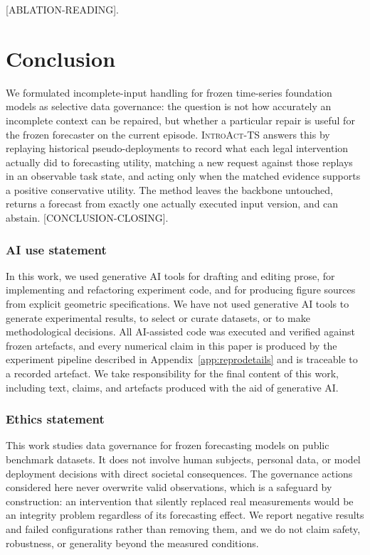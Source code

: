 \documentclass{article}
\newcommand{\ph}[1]{\textcolor{phgray}{\textsf{[#1]}}}
\newcommand{\introact}{\textsc{IntroAct-TS}}
\begin{document}
\ph{ABLATION-READING}.

\section{Conclusion}
\label{sec:conclusion}
We formulated incomplete-input handling for frozen time-series foundation models as
selective data governance: the question is not how accurately an incomplete context can be
repaired, but whether a particular repair is useful for the frozen forecaster on the
current episode. \introact{} answers this by replaying historical pseudo-deployments to
record what each legal intervention actually did to forecasting utility, matching a new
request against those replays in an observable task state, and acting only when the
matched evidence supports a positive conservative utility. The method leaves the backbone
untouched, returns a forecast from exactly one actually executed input version, and can
abstain. \ph{CONCLUSION-CLOSING}.

\subsubsection*{AI use statement}
In this work, we used generative AI tools for drafting and editing prose, for
implementing and refactoring experiment code, and for producing figure sources from
explicit geometric specifications. We have not used generative AI tools to generate
experimental results, to select or curate datasets, or to make methodological decisions.
All AI-assisted code was executed and verified against frozen artefacts, and every
numerical claim in this paper is produced by the experiment pipeline described in
Appendix~\ref{app:reprodetails} and is traceable to a recorded artefact. We take
responsibility for the final content of this work, including text, claims, and artefacts
produced with the aid of generative AI.
\subsubsection*{Ethics statement}
This work studies data governance for frozen forecasting models on public benchmark
datasets. It does not involve human subjects, personal data, or model deployment
decisions with direct societal consequences. The governance actions considered here never
overwrite valid observations, which is a safeguard by construction: an intervention that
silently replaced real measurements would be an integrity problem regardless of its
forecasting effect. We report negative results and failed configurations rather than
removing them, and we do not claim safety, robustness, or generality beyond the measured
conditions.
\end{document}
